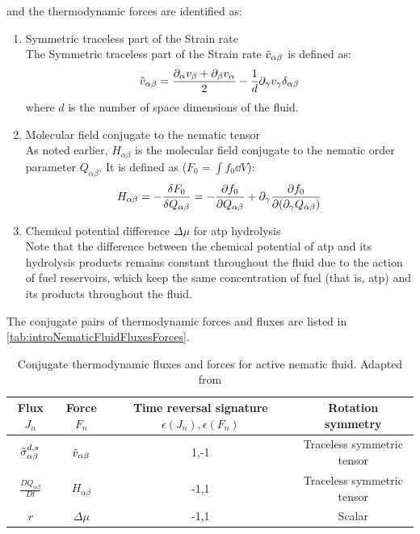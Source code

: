 and the thermodynamic forces are identified as:
\begin{enumerate}
    \item Symmetric traceless part of the Strain rate\hfill\\
    The Symmetric traceless part of the Strain rate $\Tilde{v}_{\alpha\beta}$ is defined as:
    \begin{equation}\label{eq:introActiveNematicStrainRate}
        \Tilde{v}_{\alpha\beta} = \frac{\inlinePartial{\alpha}{v_\beta} + \inlinePartial{\beta}{v_\alpha}}{2} - \frac{1}{d}\inlinePartial{\gamma}{v_\gamma}\delta_{\alpha\beta}
    \end{equation}
    where $d$ is the number of space dimensions of the fluid.
    \item Molecular field conjugate to the nematic tensor\hfill\\
    As noted earlier, $H_{\alpha\beta}$ is the molecular field conjugate to the nematic order parameter $Q_{\alpha\beta}$. It is defined as ($F_0 = \int f_0\dd{V}$):
    \begin{equation}\label{eq:introMolecularFieldDefine}
        H_{\alpha\beta} = -\fdv{F_0}{Q_{\alpha\beta}} = -\pdv{f_0}{Q_{\alpha\beta}} + \inlinePartial{\gamma}{\pdv{f_0}{(\inlinePartial{\gamma}{Q_{\alpha\beta}})}}
    \end{equation}
    \item Chemical potential difference $\Delta\mu$ for \ac{atp} hydrolysis\hfill\\
    Note that the difference between the chemical potential of \ac{atp} and its hydrolysis products remains constant throughout the fluid due to the action of fuel reservoirs, which keep the same concentration of fuel (that is, \ac{atp}) and its products throughout the fluid.
\end{enumerate}
The conjugate pairs of thermodynamic forces and fluxes are listed in \autoref{tab:introNematicFluidFluxesForces}.

\begin{table}[h]
    \centering
    \begin{tabular}{|c|c|c|c|}
        \hline
        Flux $J_n$ & Force $F_n$ & Time reversal signature $\epsilon(J_n), \epsilon(F_n)$ & Rotation symmetry\\
        \hline
        $\Tilde{\sigma}^{d,s}_{\alpha\beta}$ & $\Tilde{v}_{\alpha\beta}$ & 1,-1 & Traceless symmetric tensor\\
        $\frac{DQ_{\alpha\beta}}{Dt}$ & $H_{\alpha\beta}$ & -1,1 & Traceless symmetric tensor \\
        $r$ & $\Delta\mu$ & -1,1 & Scalar \\
        \hline
    \end{tabular}
    \caption{Conjugate thermodynamic fluxes and forces for active nematic fluid. Adapted from \cite{julicher2018hydrodynamic}}
    \label{tab:introNematicFluidFluxesForces}
\end{table}

